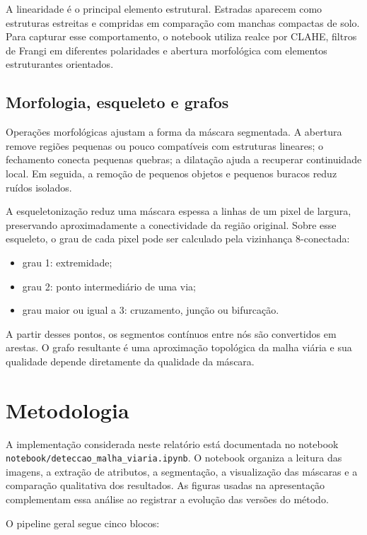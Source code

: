 \documentclass[12pt,a4paper]{article}
\begin{document}
A linearidade é o principal elemento estrutural. Estradas aparecem como estruturas estreitas e compridas em comparação com manchas compactas de solo. Para capturar esse comportamento, o notebook utiliza realce por CLAHE, filtros de Frangi em diferentes polaridades e abertura morfológica com elementos estruturantes orientados.

\subsection{Morfologia, esqueleto e grafos}

Operações morfológicas ajustam a forma da máscara segmentada. A abertura remove regiões pequenas ou pouco compatíveis com estruturas lineares; o fechamento conecta pequenas quebras; a dilatação ajuda a recuperar continuidade local. Em seguida, a remoção de pequenos objetos e pequenos buracos reduz ruídos isolados.

A esqueletonização reduz uma máscara espessa a linhas de um pixel de largura, preservando aproximadamente a conectividade da região original. Sobre esse esqueleto, o grau de cada pixel pode ser calculado pela vizinhança 8-conectada:

\begin{itemize}
    \item grau 1: extremidade;
    \item grau 2: ponto intermediário de uma via;
    \item grau maior ou igual a 3: cruzamento, junção ou bifurcação.
\end{itemize}

A partir desses pontos, os segmentos contínuos entre nós são convertidos em arestas. O grafo resultante é uma aproximação topológica da malha viária e sua qualidade depende diretamente da qualidade da máscara.

\section{Metodologia}

A implementação considerada neste relatório está documentada no notebook \texttt{notebook/deteccao\_malha\_viaria.ipynb}. O notebook organiza a leitura das imagens, a extração de atributos, a segmentação, a visualização das máscaras e a comparação qualitativa dos resultados. As figuras usadas na apresentação complementam essa análise ao registrar a evolução das versões do método.

O pipeline geral segue cinco blocos:
\end{document}
